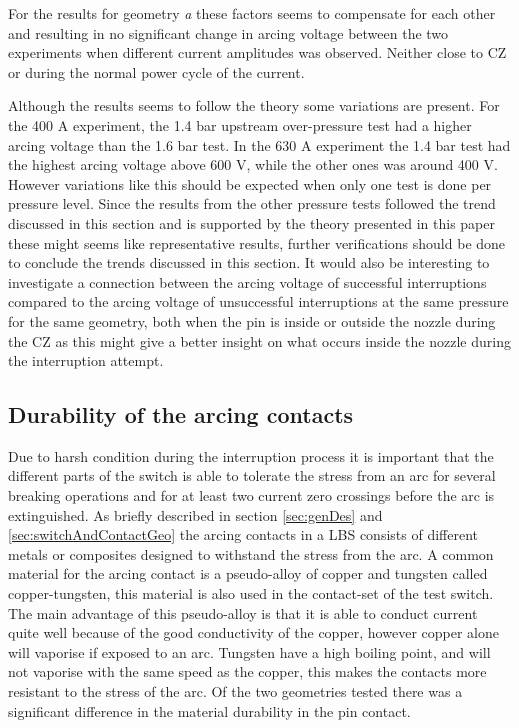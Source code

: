 \documentclass[10pt,a4paper,twoside]{article}
\begin{document}
For the results for geometry \textit{a} these factors seems to compensate for each other and resulting in no significant change in arcing voltage between the two experiments when different current amplitudes was observed. Neither close to CZ or during the normal power cycle of the current. 

Although the results seems to follow the theory some variations are present. For the 400 A experiment, the 1.4 bar upstream over-pressure test had a higher arcing voltage than the 1.6 bar test. In the 630 A experiment the 1.4 bar test had the highest arcing voltage above 600 V, while the other ones was around 400 V. However variations like this should be expected when only one test is done per pressure level. Since the results from the other pressure tests followed the trend discussed in this section and is supported by the theory presented in this paper these might seems like representative results, further verifications should be done to conclude the trends discussed in this section. It would also be interesting to investigate a connection between the arcing voltage of successful interruptions compared to the arcing voltage of unsuccessful interruptions at the same pressure for the same geometry, both when the pin is inside or outside the nozzle during the CZ as this might give a better insight on what occurs inside the nozzle during the interruption attempt.

\subsection{Durability of the arcing contacts} \label{fig:durability}

Due to harsh condition during the interruption process it is important that the different parts of the switch is able to tolerate the stress from an arc for several breaking operations and for at least two current zero crossings before the arc is extinguished. As briefly described in section \ref{sec:genDes} and \ref{sec:switchAndContactGeo} the arcing contacts in a LBS consists of different metals or composites designed to withstand the stress from the arc. A common material for the arcing contact is a pseudo-alloy of copper and tungsten called copper-tungsten, this material is also used in the contact-set of the test switch. The main advantage of this pseudo-alloy is that it is able to conduct current quite well because of the good conductivity of the copper, however copper alone will vaporise if exposed to an arc. Tungsten have a high boiling point, and will not vaporise with the same speed as the copper, this makes the contacts more resistant to the stress of the arc. Of the two geometries tested there was a significant difference in the material durability in the pin contact.
\end{document}
